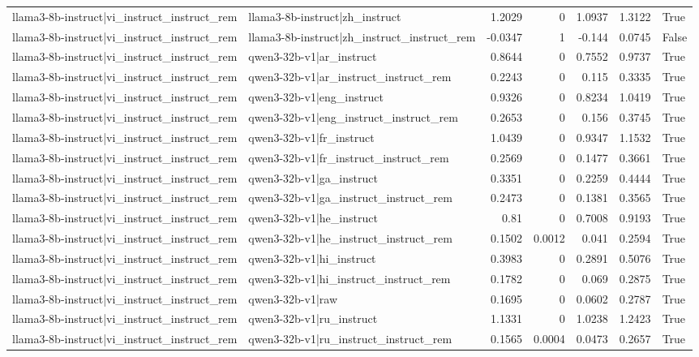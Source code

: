 \begin{table}
\begin{tabular}{l l r r r r l}
llama3-8b-instruct|vi_instruct_instruct_rem & llama3-8b-instruct|zh_instruct & 1.2029 & 0 & 1.0937 & 1.3122 & True \\
llama3-8b-instruct|vi_instruct_instruct_rem & llama3-8b-instruct|zh_instruct_instruct_rem & -0.0347 & 1 & -0.144 & 0.0745 & False \\
llama3-8b-instruct|vi_instruct_instruct_rem & qwen3-32b-v1|ar_instruct & 0.8644 & 0 & 0.7552 & 0.9737 & True \\
llama3-8b-instruct|vi_instruct_instruct_rem & qwen3-32b-v1|ar_instruct_instruct_rem & 0.2243 & 0 & 0.115 & 0.3335 & True \\
llama3-8b-instruct|vi_instruct_instruct_rem & qwen3-32b-v1|eng_instruct & 0.9326 & 0 & 0.8234 & 1.0419 & True \\
llama3-8b-instruct|vi_instruct_instruct_rem & qwen3-32b-v1|eng_instruct_instruct_rem & 0.2653 & 0 & 0.156 & 0.3745 & True \\
llama3-8b-instruct|vi_instruct_instruct_rem & qwen3-32b-v1|fr_instruct & 1.0439 & 0 & 0.9347 & 1.1532 & True \\
llama3-8b-instruct|vi_instruct_instruct_rem & qwen3-32b-v1|fr_instruct_instruct_rem & 0.2569 & 0 & 0.1477 & 0.3661 & True \\
llama3-8b-instruct|vi_instruct_instruct_rem & qwen3-32b-v1|ga_instruct & 0.3351 & 0 & 0.2259 & 0.4444 & True \\
llama3-8b-instruct|vi_instruct_instruct_rem & qwen3-32b-v1|ga_instruct_instruct_rem & 0.2473 & 0 & 0.1381 & 0.3565 & True \\
llama3-8b-instruct|vi_instruct_instruct_rem & qwen3-32b-v1|he_instruct & 0.81 & 0 & 0.7008 & 0.9193 & True \\
llama3-8b-instruct|vi_instruct_instruct_rem & qwen3-32b-v1|he_instruct_instruct_rem & 0.1502 & 0.0012 & 0.041 & 0.2594 & True \\
llama3-8b-instruct|vi_instruct_instruct_rem & qwen3-32b-v1|hi_instruct & 0.3983 & 0 & 0.2891 & 0.5076 & True \\
llama3-8b-instruct|vi_instruct_instruct_rem & qwen3-32b-v1|hi_instruct_instruct_rem & 0.1782 & 0 & 0.069 & 0.2875 & True \\
llama3-8b-instruct|vi_instruct_instruct_rem & qwen3-32b-v1|raw & 0.1695 & 0 & 0.0602 & 0.2787 & True \\
llama3-8b-instruct|vi_instruct_instruct_rem & qwen3-32b-v1|ru_instruct & 1.1331 & 0 & 1.0238 & 1.2423 & True \\
llama3-8b-instruct|vi_instruct_instruct_rem & qwen3-32b-v1|ru_instruct_instruct_rem & 0.1565 & 0.0004 & 0.0473 & 0.2657 & True \\

\end{tabular}
\end{table}
